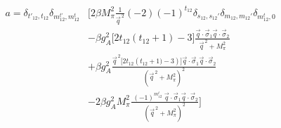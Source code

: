 \documentclass[11pt]{article}
\newcommand{\ot}{_{12}}
\newcommand{\sq}{^{\,2}}
\begin{document}
\begin{align}
    a=\delta_{t'_{12},t_{12}} \delta_{m^{t'}\ot, m^t\ot}&\Bigg[ 2 \beta M_\pi^2 
        \frac{1}{\vec{q}\sq} (-2)(-1)^{t\ot}\delta_{s\ot,s\ot'}\delta_{m_{12},m\ot'}\delta_{m^t_{12},0}\nonumber\\
     &-\beta g_A^2 \Big[ 2 t\ot (t\ot+1)-3 \Big] \frac{\vec{q} \cdot \vec{\sigma}_{1} \vec{q} \cdot
     \vec{\sigma}_{2}}{\vec{q}\sq+M_\pi^2}\nonumber\\
          &+\beta g_A^2\frac{\vec{q}\sq \Big[2 t\ot \left( t\ot+1)-3 \right) \Big]\vec{q} \cdot \vec{\sigma}_{1} \vec{q}\cdot \vec{\sigma}_{2}}{\left(\vec{q}\sq+M_\pi^2\right)^2}\nonumber\\
          &-2\beta g_A^2 M_\pi^2\frac{\;(-1)^{m^t_{12}}\; \vec{q} \cdot \vec{\sigma}_{1} \vec{q}\cdot \vec{\sigma}_{2}}{\left(\vec{q}\sq+M_\pi^2\right)^2}\Bigg]
\end{align}
\end{document}
